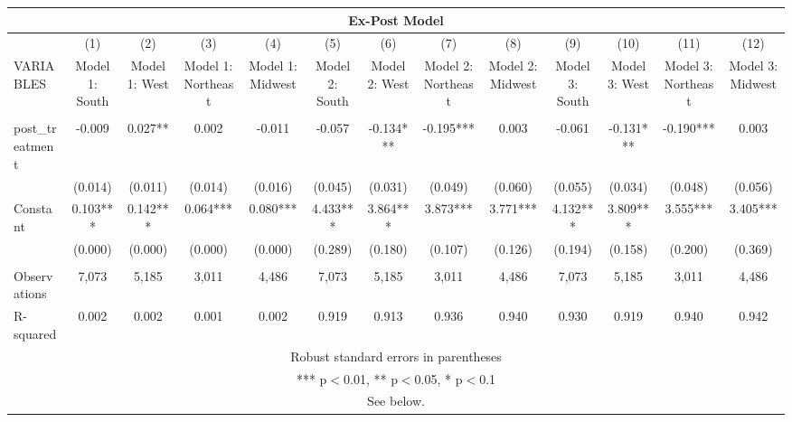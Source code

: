 \begin{tabular}{lcccccccccccc}
\multicolumn{13}{c}{Ex-Post Model} \\ \hline
 & (1) & (2) & (3) & (4) & (5) & (6) & (7) & (8) & (9) & (10) & (11) & (12) \\
VARIABLES & Model 1: South & Model 1: West & Model 1: Northeast & Model 1: Midwest & Model 2: South & Model 2: West & Model 2: Northeast & Model 2: Midwest & Model 3: South & Model 3: West & Model 3: Northeast & Model 3: Midwest \\ \hline
 &  &  &  &  &  &  &  &  &  &  &  &  \\
post\_treatment & -0.009 & 0.027** & 0.002 & -0.011 & -0.057 & -0.134*** & -0.195*** & 0.003 & -0.061 & -0.131*** & -0.190*** & 0.003 \\
 & (0.014) & (0.011) & (0.014) & (0.016) & (0.045) & (0.031) & (0.049) & (0.060) & (0.055) & (0.034) & (0.048) & (0.056) \\
Constant & 0.103*** & 0.142*** & 0.064*** & 0.080*** & 4.433*** & 3.864*** & 3.873*** & 3.771*** & 4.132*** & 3.809*** & 3.555*** & 3.405*** \\
 & (0.000) & (0.000) & (0.000) & (0.000) & (0.289) & (0.180) & (0.107) & (0.126) & (0.194) & (0.158) & (0.200) & (0.369) \\
 &  &  &  &  &  &  &  &  &  &  &  &  \\
Observations & 7,073 & 5,185 & 3,011 & 4,486 & 7,073 & 5,185 & 3,011 & 4,486 & 7,073 & 5,185 & 3,011 & 4,486 \\
 R-squared & 0.002 & 0.002 & 0.001 & 0.002 & 0.919 & 0.913 & 0.936 & 0.940 & 0.930 & 0.919 & 0.940 & 0.942 \\ \hline
\multicolumn{13}{c}{ Robust standard errors in parentheses} \\
\multicolumn{13}{c}{ *** p$<$0.01, ** p$<$0.05, * p$<$0.1} \\
\multicolumn{13}{c}{ See below.} \\
\end{tabular}
